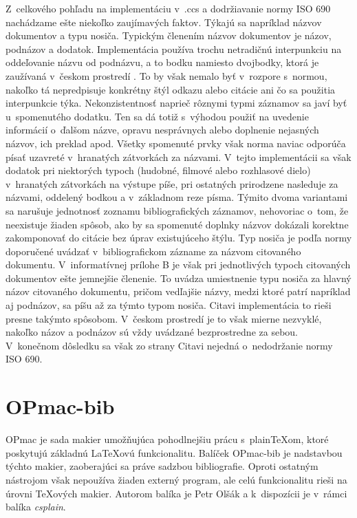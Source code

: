 \documentclass{fithesis3}
\begin{document}
	Z~celkového pohľadu na implementáciu v~.ccs a dodržiavanie normy ISO 690 nachádzame ešte niekoľko zaujímavých faktov. Týkajú sa napríklad názvov dokumentov a typu nosiča. Typickým členením názvov dokumentov je názov, podnázov a dodatok. Implementácia používa trochu netradičnú interpunkciu na oddeľovanie názvu od podnázvu, a to bodku namiesto dvojbodky, ktorá je zaužívaná v~českom prostredí \cite{Biernatova2011, Bratkova2011}. To by však nemalo byť v~rozpore s~normou, nakoľko tá nepredpisuje konkrétny štýl odkazu alebo citácie ani čo sa použitia interpunkcie týka. Nekonzistentnosť naprieč rôznymi typmi záznamov sa javí byť u~spomenutého dodatku. Ten sa dá totiž s~výhodou použiť na uvedenie informácií o~ďalšom názve, opravu nesprávnych  alebo doplnenie nejasných názvov, ich preklad apod. Všetky spomenuté prvky však norma naviac odporúča písať uzavreté v~hranatých zátvorkách za názvami. V~tejto implementácii sa však dodatok pri niektorých typoch (hudobné, filmové alebo rozhlasové dielo) v~hranatých zátvorkách na výstupe píše, pri ostatných prirodzene nasleduje za názvami, oddelený bodkou a v~základnom reze písma. Týmito dvoma variantami sa narušuje jednotnosť zoznamu bibliografických záznamov, nehovoriac o~tom, že neexistuje žiaden spôsob, ako by sa spomenuté doplnky názvov dokázali korektne zakomponovať do citácie bez úprav existujúceho štýlu.
	Typ nosiča je podľa normy doporučené uvádzať v~bibliografickom zázname za názvom citovaného dokumentu. V~informatívnej prílohe B je však pri jednotlivých typoch citovaných dokumentov ešte jemnejšie členenie. To uvádza umiestnenie typu nosiča za hlavný názov citovaného dokumentu, pričom vedľajšie názvy, medzi ktoré patrí napríklad aj podnázov, sa píšu až za týmto typom nosiča. Citavi implementácia to rieši presne takýmto spôsobom. V~českom prostredí je to však mierne nezvyklé, nakoľko názov a podnázov sú vždy uvádzané bezprostredne za sebou. V~konečnom dôsledku sa však zo strany Citavi nejedná o~nedodržanie normy ISO 690.

	\section{OPmac-bib}

	OPmac je sada makier umožňujúca pohodlnejšiu prácu s~plain\TeX om, ktoré poskytujú základnú \LaTeX ovú funkcionalitu. Balíček OPmac-bib je nadstavbou týchto makier, zaoberajúci sa práve sadzbou bibliografie. Oproti ostatným nástrojom však nepoužíva žiaden externý program, ale celú funkcionalitu rieši na úrovni \TeX ových makier. Autorom balíka je Petr Olšák a k~dispozícii je v~rámci balíka \textit{csplain}.
	
\end{document}
